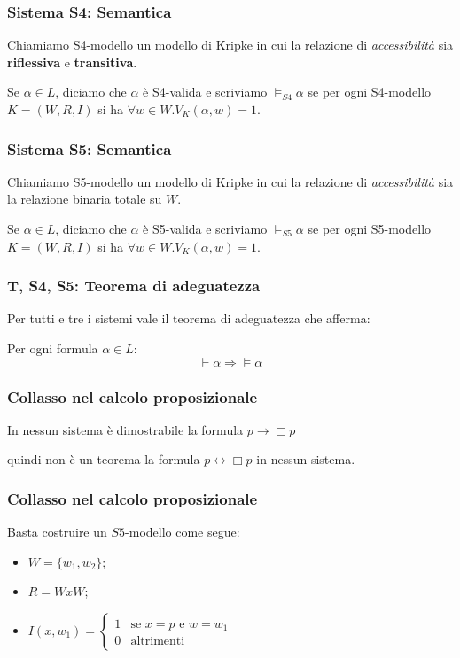 \documentclass[notheorem,aspectratio=169]{beamer}
\begin{document}
\begin{frame}
\frametitle{Sistema S4: Semantica}
Chiamiamo S4-modello un modello di Kripke in cui la relazione di \emph{accessibilità}
sia \textbf{riflessiva} e \textbf{transitiva}.

Se $\alpha \in L$, diciamo che $\alpha$ è S4-valida e scriviamo
$\vDash_{S4} \alpha$ se per ogni S4-modello $K = (W, R, I)$
si ha $\forall w \in W. V_K(\alpha, w) = 1$.
\end{frame}

\begin{frame}
\frametitle{Sistema S5: Semantica}
Chiamiamo S5-modello un modello di Kripke in cui la relazione di \emph{accessibilità}
sia la relazione binaria totale su $W$.

Se $\alpha \in L$, diciamo che $\alpha$ è S5-valida e scriviamo
$\vDash_{S5} \alpha$ se per ogni S5-modello $K = (W, R, I)$
si ha $\forall w \in W. V_K(\alpha, w) = 1$.
\end{frame}

\begin{frame}
\frametitle{T, S4, S5: Teorema di adeguatezza}
Per tutti e tre i sistemi vale il teorema di adeguatezza che afferma:

Per ogni formula $\alpha \in L$:
$$\vdash \alpha \Rightarrow \vDash \alpha$$
\end{frame}

\begin{frame}
\frametitle{Collasso nel calcolo proposizionale}
In nessun sistema è dimostrabile la formula $p \rightarrow \Box p$

quindi non è un teorema la formula $p \leftrightarrow \Box p$ in nessun sistema.
\end{frame}

\begin{frame}
\frametitle{Collasso nel calcolo proposizionale}
Basta costruire un $S5$-modello come segue:
\begin{itemize}
    \item $W = \{w_1, w_2\}$;
    \item $R = W x W$;
    \item $I(x, w_1) = \begin{cases}
                      1 & \mbox{se } x = p \mbox{ e } w = w_1 \\
                      0 & \mbox{altrimenti}
    \end{cases}$
\end{itemize}
\end{frame}
\end{document}
